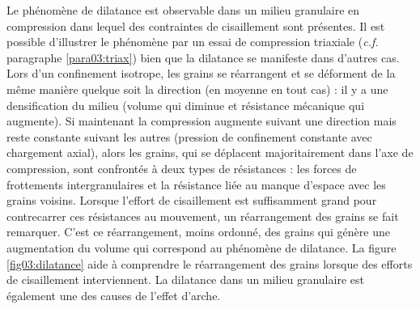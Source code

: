 				Le phénomène de dilatance est observable dans un milieu granulaire en compression dans lequel des contraintes de cisaillement sont présentes. Il est possible d'illustrer le phénomène par un essai de compression triaxiale (\textit{c.f.} paragraphe \ref{para03:triax}) bien que la dilatance se manifeste dans d'autres cas. Lors d'un confinement isotrope, les grains se réarrangent et se déforment de la même manière quelque soit la direction (en moyenne en tout cas) : il y a une densification du milieu (volume qui diminue et résistance mécanique qui augmente). Si maintenant la compression augmente suivant une direction mais reste constante suivant les autres (pression de confinement constante avec chargement axial), alors les grains, qui se déplacent majoritairement dans l'axe de compression, sont confrontés à deux types de résistances : les forces de frottements intergranulaires et la résistance liée au manque d'espace avec les grains voisins. Lorsque l'effort de cisaillement est suffisamment grand pour contrecarrer ces résistances au mouvement, un réarrangement des grains se fait remarquer. C'est ce réarrangement, moins ordonné, des grains qui génère une augmentation du volume qui correspond au phénomène de dilatance. La figure \ref{fig03:dilatance} aide à comprendre le réarrangement des grains lorsque des efforts de cisaillement interviennent. La dilatance dans un milieu granulaire est également une des causes de l'effet d'arche.
